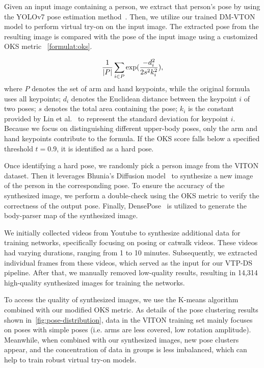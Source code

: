 Given an input image containing a person, we extract that person's pose by using the YOLOv7 pose estimation method~\cite{Wang-CVPR2023-YOLOv7}. Then, we utilize our trained DM-VTON model to perform virtual try-on on the input image. The extracted pose from the resulting image is compared with the pose of the input image using a customized OKS metric ~\autoref{formulat:oks}.  

\begin{equation}
    \centering
    \frac{1}{|P|}\sum_{i \in P} \exp(\frac{-d_i^2}{2 s^2 k_i^2}),
    \label{formulat:oks}
\end{equation}
where $P$ denotes the set of arm and hand keypoints, while the original formula uses all keypoints; $d_i$ denotes the Euclidean distance between the keypoint $i$ of two poses; $s$ denotes the total area containing the pose; $k_i$ is the constant provided by Lin et al.~\cite{Lin-ECCV2014-Microsoft} to represent the standard deviation for keypoint $i$. Because we focus on distinguishing different upper-body poses, only the arm and hand keypoints contribute to the formula. If the OKS score falls below a specified threshold $t=0.9$, it is identified as a hard pose.

Once identifying a hard pose, we randomly pick a person image from the VITON dataset. Then it leverages Bhunia's Diffusion model~\cite{Bhunia-CVPR2023-Person} to synthesize a new image of the person in the corresponding pose. To ensure the accuracy of the synthesized image, we perform a double-check using the OKS metric to verify the correctness of the output pose. Finally, DensePose~\cite{Guler-CVPR2018-DensePose} is utilized to generate the body-parser map of the synthesized image.

We initially collected videos from Youtube to synthesize additional data for training networks, specifically focusing on posing or catwalk videos. These videos had varying durations, ranging from 1 to 10 minutes. Subsequently, we extracted individual frames from these videos, which served as the input for our VTP-DS pipeline. %
After that, we manually removed low-quality results, resulting in 14,314 high-quality synthesized images for training the networks. 

To access the quality of synthesized images, we use the K-means algorithm combined with our modified OKS metric. As details of the pose clustering results shown in~\autoref{fig:pose-distribution}, data in the VITON training set mainly focuses on poses with simple poses (i.e. arms are less covered, low rotation amplitude). Meanwhile, when combined with our synthesized images, new pose clusters appear, and the concentration of data in groups is less imbalanced, which can help to train robust virtual try-on models. 

